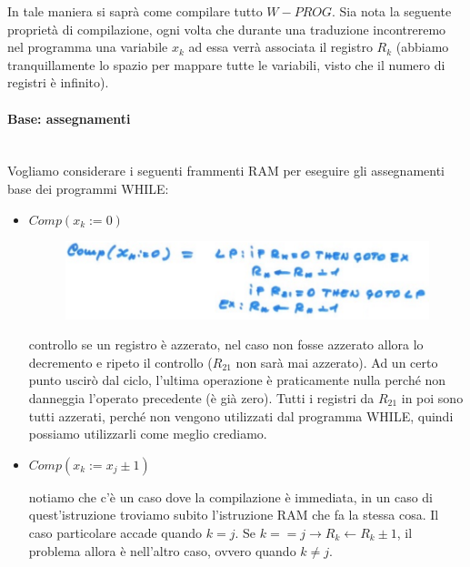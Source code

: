 \documentclass{article}
\begin{document}
In tale maniera si saprà come compilare tutto $W-PROG$. Sia nota la seguente proprietà di compilazione,
ogni volta che durante una traduzione incontreremo nel programma una variabile $x_k$ ad essa verrà
associata il registro $R_k$ (abbiamo tranquillamente lo spazio per mappare tutte le variabili, visto
che il numero di registri è infinito).

\paragraph{Base: assegnamenti}\mbox{}\\
Vogliamo considerare i seguenti frammenti RAM per eseguire gli assegnamenti base dei programmi WHILE:
\begin{itemize}
    \item $Comp(x_k:=0)$
          \begin{figure}[H]
              \centering
              \includegraphics[scale=0.4]{images/assegnamento_ram.png}
          \end{figure}
          controllo se un registro è azzerato, nel caso non fosse azzerato allora lo decremento
          e ripeto il controllo ($R_{21}$ non sarà mai azzerato). Ad un certo punto uscirò dal ciclo,
          l'ultima operazione è praticamente nulla perché non danneggia l'operato precedente (è già zero).
          Tutti i registri da $R_{21}$ in poi sono tutti azzerati, perché non vengono utilizzati dal programma
          WHILE, quindi possiamo utilizzarli come meglio crediamo.

    \item $Comp(x_k:=x_j\pm 1)$

          notiamo che c'è un caso dove la compilazione è immediata, in un caso di quest'istruzione
          troviamo subito l'istruzione RAM che fa la stessa cosa. Il caso particolare accade quando
          $k=j$. Se $k==j\rightarrow R_k\leftarrow R_k\pm 1$, il problema allora è nell'altro caso,
          ovvero quando $k\neq j$.


\end{itemize}
\end{document}
